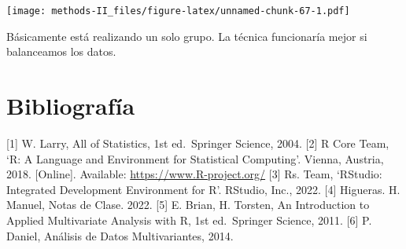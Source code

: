 \documentclass[
]{article}
\begin{document}
\texttt{[image: methods-II\_files/figure-latex/unnamed-chunk-67-1.pdf]}

Básicamente está realizando un solo grupo. La técnica funcionaría mejor
si balanceamos los datos.

\hypertarget{bibliografuxeda}{%
\section{Bibliografía}\label{bibliografuxeda}}

{[}1{]} W. Larry, All of Statistics, 1st ed.~Springer Science, 2004.
{[}2{]} R Core Team, `R: A Language and Environment for Statistical
Computing'. Vienna, Austria, 2018. {[}Online{]}. Available:
\url{https://www.R-project.org/} {[}3{]} Rs. Team, `RStudio: Integrated
Development Environment for R'. RStudio, Inc., 2022. {[}4{]} Higueras.
H. Manuel, Notas de Clase. 2022. {[}5{]} E. Brian, H. Torsten, An
Introduction to Applied Multivariate Analysis with R, 1st ed.~Springer
Science, 2011. {[}6{]} P. Daniel, Análisis de Datos Multivariantes,
2014.
\end{document}
